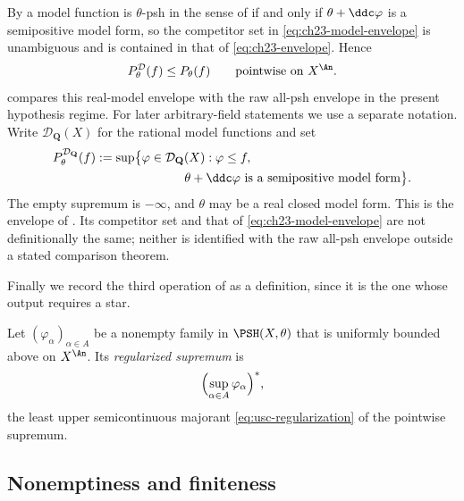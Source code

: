By  a model function is \(\theta\)-psh in
the sense of  if and only if \(\theta+\ddc\varphi\) is
a semipositive model form, so the competitor set in
\eqref{eq:ch23-model-envelope} is unambiguous and is contained in that of
\eqref{eq:ch23-envelope}.  Hence
\begin{equation}\label{eq:ch23-model-envelope-below}
 P^{\mathcal D}_\theta(f)\leq P_\theta(f)
 \qquad\text{pointwise on }X^{\An}.
\end{equation}
 compares this real-model
envelope with the raw all-psh envelope in the present hypothesis regime.
For later arbitrary-field statements we use a separate notation.  Write
\(\mathcal D_{\mathbf Q}(X)\) for the rational model functions and set
\[
\begin{aligned}
 P^{\mathcal D_{\mathbf Q}}_\theta(f)
 &:=\sup\bigl\{\varphi\in\mathcal D_{\mathbf Q}(X):\varphi\leq f,\\
 &\hspace{25mm}\theta+\ddc\varphi
                    \text{ is a semipositive model form}\bigr\}.
\end{aligned}
\]
The empty supremum is \(-\infty\), and \(\theta\) may be a real closed
model form.  This is the envelope
of \cite[\S\S2.2--2.8]{GJKM19}.  Its competitor set and that of
\eqref{eq:ch23-model-envelope} are not definitionally the same; neither
is identified with the raw all-psh envelope outside a stated comparison
theorem.

Finally we record the third operation of  as a
definition, since it is the one whose output requires a star.

\begin{definition}
\label{def:ch23-regularized-sup}
Let \((\varphi_\alpha)_{\alpha\in A}\) be a nonempty family in
\(\PSH(X,\theta)\) that is uniformly bounded above on \(X^{\An}\).  Its
\emph{regularized supremum} is
\begin{equation}\label{eq:ch23-regularized-sup}
 \Bigl(\sup_{\alpha\in A}\varphi_\alpha\Bigr)^{*},
\end{equation}
the least upper semicontinuous majorant \eqref{eq:usc-regularization} of the
pointwise supremum.
\end{definition}

\subsection{Nonemptiness and finiteness}
\label{sec:ch23-finiteness}

